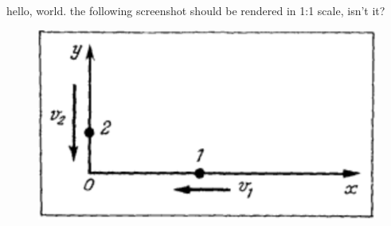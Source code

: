 \documentclass{book}
\begin{document}
\mainmatter
hello, world.
the following screenshot should be rendered in 1:1 scale, isn't it?

\begin{figure}
\centering
\includegraphics{img1.png}
\end{figure}
\end{document}

